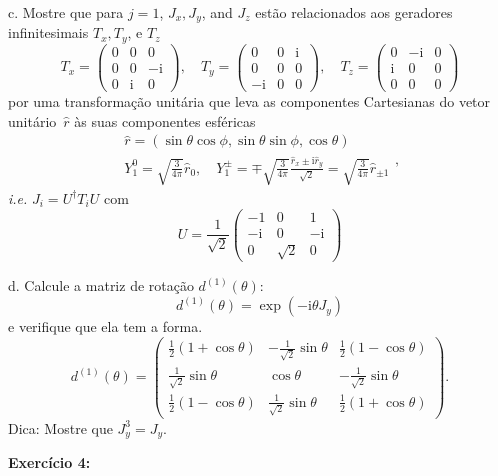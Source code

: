 \documentclass[12pt]{article}
\begin{document}
c. Mostre que para $j=1$, $J_{x}, J_{y}$, and $J_{z}$ estão relacionados aos geradores infinitesimais $T_{x}, T_{y}$, e $T_{z}$ 
\[
T_{x}=\left(\begin{array}{ccc}0 & 0 & 0 \\ 0 & 0 & -\mathrm{i} \\ 0 & \mathrm{i} & 0\end{array}\right), \quad 
T_{y}=\left(\begin{array}{ccc}0 & 0 & \mathrm{i} \\ 0 & 0 & 0 \\ -\mathrm{i} & 0 & 0\end{array}\right), \quad 
T_{z}=\left(\begin{array}{ccc}0 & -\mathrm{i} & 0 \\ \mathrm{i} & 0 & 0 \\ 0 & 0 & 0\end{array}\right)
\]
por uma transformação unitária que leva as componentes Cartesianas do vetor unitário $\hat{r}$ às suas componentes esféricas
\[
\begin{array}{c}
\hat{r}=(\sin \theta \cos \phi, \sin \theta \sin \phi, \cos \theta) \\ 
Y_{1}^{0}=\sqrt{\frac{3}{4 \pi}} \hat{r}_{0}, \quad Y_{1}^{\pm}=\mp \sqrt{\frac{3}{4 \pi}} \frac{\hat{r}_{x} \pm \mathrm{i} \hat{r}_{y}}{\sqrt{2}}=\sqrt{\frac{3}{4 \pi}} \hat{r}_{\pm 1}
\end{array},
\]
\textit{i.e.} $J_{i}=U^{\dagger} T_{i} U$ com
\[
U=\frac{1}{\sqrt{2}}\left(\begin{array}{ccc}-1 & 0 & 1 \\ -\mathrm{i} & 0 & -\mathrm{i} \\ 0 & \sqrt{2} & 0\end{array}\right)
\]

d. Calcule a matriz de rotação $d^{(1)}(\theta)$:
\[
d^{(1)}(\theta)=\exp \left(-\mathrm{i} \theta J_{y}\right)
\]
e verifique que ela tem a forma.
\[
d^{(1)}(\theta)=\left(\begin{array}{ccc}\frac{1}{2}(1+\cos \theta) & -\frac{1}{\sqrt{2}} \sin \theta & \frac{1}{2}(1-\cos \theta) \\ \frac{1}{\sqrt{2}} \sin \theta & \cos \theta & -\frac{1}{\sqrt{2}} \sin \theta \\ \frac{1}{2}(1-\cos \theta) & \frac{1}{\sqrt{2}} \sin \theta & \frac{1}{2}(1+\cos \theta)\end{array}\right).
\]
Dica: Mostre que $J_{y}^{3}=J_{y}$.

\textbf{Exercício 4:}
\end{document}
